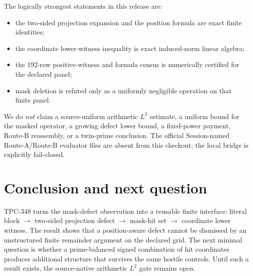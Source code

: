 \documentclass[10pt]{article}
\begin{document}
The logically strongest statements in this release are:
\begin{itemize}
  \item the two-sided projection expansion and the position formula are exact
        finite identities;
  \item the coordinate lower-witness inequality is exact induced-norm linear
        algebra;
  \item the 192-row positive-witness and formula census is numerically
        certified for the declared panel;
  \item mask deletion is refuted only as a uniformly negligible operation on
        that finite panel.
\end{itemize}

We do \emph{not} claim a source-uniform arithmetic $L^2$ estimate, a uniform
bound for the masked operator, a growing defect lower bound, a fixed-power
payment, Route-B reassembly, or a twin-prime conclusion.  The official
Session-named Route-A/Route-B evaluator files are absent from this checkout;
the local bridge is explicitly fail-closed.

\section{Conclusion and next question}

TPC-348 turns the mask-defect observation into a reusable finite interface:
literal block $\to$ two-sided projection defect $\to$ mask-hit set $\to$
coordinate lower witness.  The result shows that a position-aware defect
cannot be dismissed by an unstructured finite remainder argument on the
declared grid.  The next minimal question is whether a prime-balanced signed
combination of hit coordinates produces additional structure that survives
the same hostile controls.  Until such a result exists, the source-native
arithmetic $L^2$ gate remains open.



\end{document}
